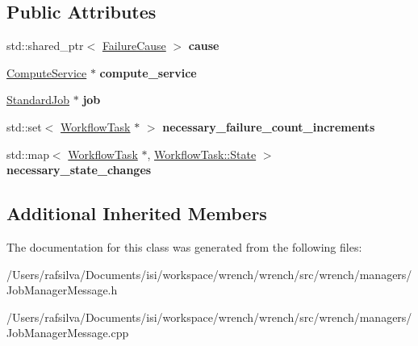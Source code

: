 \subsection*{Public Attributes}
\begin{DoxyCompactItemize}
\item 
\mbox{\label{classwrench_1_1_job_manager_standard_job_failed_message_a92bbfbd17cef8a767142fb5d7f5fbd94}} 
std\+::shared\+\_\+ptr$<$ \hyperlink{classwrench_1_1_failure_cause}{Failure\+Cause} $>$ {\bfseries cause}
\item 
\mbox{\label{classwrench_1_1_job_manager_standard_job_failed_message_a68e55e0402a50af38047943063bb22a3}} 
\hyperlink{classwrench_1_1_compute_service}{Compute\+Service} $\ast$ {\bfseries compute\+\_\+service}
\item 
\mbox{\label{classwrench_1_1_job_manager_standard_job_failed_message_afbd6f5edefaf782622136149b8fbeace}} 
\hyperlink{classwrench_1_1_standard_job}{Standard\+Job} $\ast$ {\bfseries job}
\item 
\mbox{\label{classwrench_1_1_job_manager_standard_job_failed_message_a23cde37f6f41ec85557a3686e32962a1}} 
std\+::set$<$ \hyperlink{classwrench_1_1_workflow_task}{Workflow\+Task} $\ast$ $>$ {\bfseries necessary\+\_\+failure\+\_\+count\+\_\+increments}
\item 
\mbox{\label{classwrench_1_1_job_manager_standard_job_failed_message_a872347ab64144896e7bf7aa3a462e683}} 
std\+::map$<$ \hyperlink{classwrench_1_1_workflow_task}{Workflow\+Task} $\ast$, \hyperlink{classwrench_1_1_workflow_task_a1184f3d7aea21e1c87a9b17e84f1f92a}{Workflow\+Task\+::\+State} $>$ {\bfseries necessary\+\_\+state\+\_\+changes}
\end{DoxyCompactItemize}
\subsection*{Additional Inherited Members}


The documentation for this class was generated from the following files\+:\begin{DoxyCompactItemize}
\item 
/\+Users/rafsilva/\+Documents/isi/workspace/wrench/wrench/src/wrench/managers/Job\+Manager\+Message.\+h\item 
/\+Users/rafsilva/\+Documents/isi/workspace/wrench/wrench/src/wrench/managers/Job\+Manager\+Message.\+cpp\end{DoxyCompactItemize}
